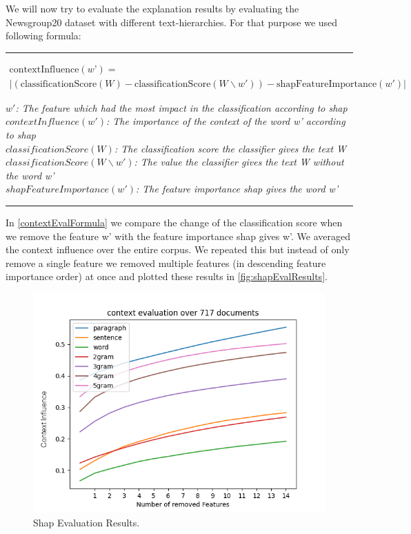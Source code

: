 We will now try to evaluate the explanation results by evaluating the Newsgroup20 \cite{Newsgroups20} dataset with different text-hierarchies. For that purpose we used following formula:

\noindent\rule[0.5ex]{\linewidth}{1pt}

\textbf{\begin{multline}
\label{contextEvalFormula}
\mathrm{contextInfluence}(w’) = \\
| (\mathrm{classificationScore}(W)- \mathrm{classificationScore}(W\backslash w')) - \mathrm{shapFeatureImportance}(w') |
\end{multline}}

\textit{$w'$: The feature which had the most impact in the classification according to shap} \\
\textit{$contextInfluence(w')$: The importance of the context of the word w' according to shap} \\
\textit{$classificationScore(W)$: The classification score the classifier gives the text W}\\
\textit{$classificationScore(W \backslash w')$: The value the classifier gives the text W without the word w'}\\
\textit{$shapFeatureImportance(w')$: The feature importance shap gives the word w'}

\noindent\rule[0.5ex]{\linewidth}{1pt}
\vspace{1cm}

In \autoref{contextEvalFormula} we compare the change of the classification score when we remove the feature w' with the feature importance shap gives w'. We averaged the context influence over the entire corpus. We repeated this but instead of only remove a single feature we removed multiple features (in descending feature importance order) at once and plotted these results in \autoref{fig:shapEvalResults}.


\begin{figure}[H]
\centering
\includegraphics[width=\linewidth]{images/06_results/clemensEvalPlotAllSelectedDocsCombinedYAXIS.png}
\caption{Shap Evaluation Results.}
\label{fig:shapEvalResults}
\end{figure}

